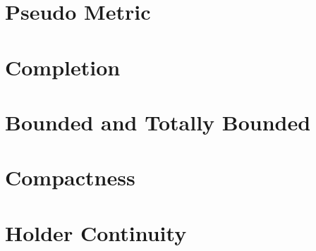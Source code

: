 \documentclass{report}
\begin{document}
\section{Pseudo Metric}
\section{Completion}
\section{Bounded and Totally Bounded}
\section{Compactness}
\section{Holder Continuity}
\end{document}
